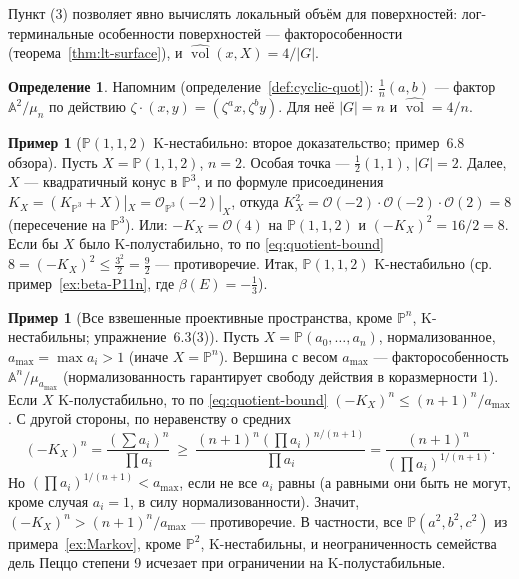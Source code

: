 \documentclass[11pt,a4paper]{article}
\theoremstyle{plain}
\theoremstyle{definition}
\newtheorem{definition}[theorem]{Определение}
\newtheorem{example}[theorem]{Пример}
\theoremstyle{remark}
\newcommand{\PP}{\mathbb{P}}
\newcommand{\A}{\mathbb{A}}
\newcommand{\cO}{\mathcal{O}}
\DeclareMathOperator{\vol}{vol}
\newcommand{\hvol}{\widehat{\vol}}
\begin{document}
Пункт (3) позволяет явно вычислять локальный объём для поверхностей: лог-терминальные особенности поверхностей ---
факторособенности (теорема~\ref{thm:lt-surface}), и $\hvol(x,X)=4/|G|$.

\begin{definition}
Напомним (определение~\ref{def:cyclic-quot}): $\frac1n(a,b)$ --- фактор $\A^2/\mu_n$ по действию
$\zeta\cdot(x,y)=(\zeta^ax,\zeta^by)$. Для неё $|G|=n$ и $\hvol=4/n$.
\end{definition}

\begin{example}[$\PP(1,1,2)$ K-нестабильно: второе доказательство; пример~6.8 обзора]\label{ex:P112-nvol}
Пусть $X=\PP(1,1,2)$, $n=2$. Особая точка --- $\frac12(1,1)$, $|G|=2$. Далее, $X$ --- квадратичный
конус в $\PP^3$, и по формуле присоединения $K_X=(K_{\PP^3}+X)|_X=\cO_{\PP^3}(-2)|_X$, откуда
$K_X^2=\cO(-2)\cdot\cO(-2)\cdot\cO(2)=8$ (пересечение на $\PP^3$). Или: $-K_X=\cO(4)$ на $\PP(1,1,2)$
и $(-K_X)^2=16/2=8$. Если бы $X$ было K-полустабильно, то по \eqref{eq:quotient-bound}
$8=(-K_X)^2\le\frac{3^2}{2}=\frac92$ --- противоречие. Итак, $\PP(1,1,2)$ K-нестабильно (ср.
пример~\ref{ex:beta-P11n}, где $\beta(E)=-\frac13$).
\end{example}

\begin{example}[Все взвешенные проективные пространства, кроме $\PP^n$, K-нестабильны; упражнение~6.3(3)]\label{ex:wps-unstable}
Пусть $X=\PP(a_0,\dots,a_n)$, нормализованное, $a_{\max}=\max a_i>1$ (иначе $X=\PP^n$). Вершина
с весом $a_{\max}$ --- факторособенность $\A^n/\mu_{a_{\max}}$ (нормализованность гарантирует
свободу действия в коразмерности 1). Если $X$ K-полустабильно, то по \eqref{eq:quotient-bound}
$(-K_X)^n\le(n+1)^n/a_{\max}$. С другой стороны, по неравенству о средних
\[
(-K_X)^n=\frac{(\sum a_i)^n}{\prod a_i}\ \ge\ \frac{(n+1)^n(\prod a_i)^{n/(n+1)}}{\prod a_i}
=\frac{(n+1)^n}{(\prod a_i)^{1/(n+1)}} .
\]
Но $(\prod a_i)^{1/(n+1)}<a_{\max}$, если не все $a_i$ равны (а равными они быть не могут, кроме
случая $a_i=1$, в силу нормализованности). Значит, $(-K_X)^n>(n+1)^n/a_{\max}$ --- противоречие.
В частности, все $\PP(a^2,b^2,c^2)$ из примера~\ref{ex:Markov}, кроме $\PP^2$, K-нестабильны, и
неограниченность семейства дель Пеццо степени 9 исчезает при ограничении на K-полустабильные.
\end{example}
\end{document}
